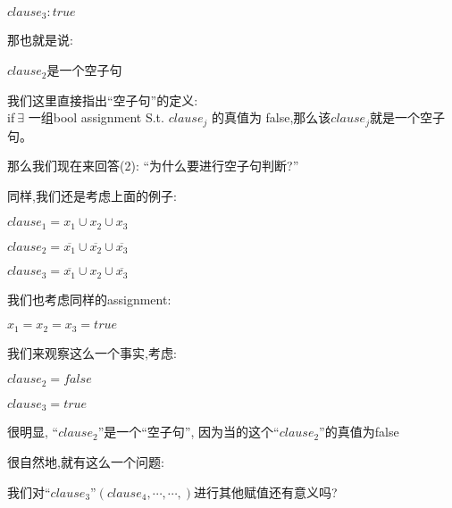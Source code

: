         \begin{center}
            $clause_{3}:true$
        \end{center}
        \par
        那也就是说:
        \begin{center}
            $clause_{2}$是一个空子句
        \end{center}
        \par
        我们这里直接指出``空子句''的定义:\\
        if$\ \exists$ 一组bool assignment 
        S.t. $clause_{j}$ 的真值为 false,那么该$clause_{j}$就是一个空子句。
        \newline
        \par
        那么我们现在来回答(2):   ``为什么要进行空子句判断?''\\
        \par
        同样,我们还是考虑上面的例子:
        \begin{center}
            $clause_{1} = x_{1} \cup x_{2} \cup x_{3}$
        \end{center}
        \begin{center}
            $clause_{2} = \overline{x_{1}} \cup \overline{x_{2}} \cup \overline{x_{3}}$
        \end{center}
        \begin{center}
            $clause_{3} = \overline{x_{1}} \cup x_{2} \cup \overline{x_{3}}$
        \end{center}
        \par
        我们也考虑同样的assignment:
        \begin{center}
            $x_{1}=x_{2}=x_{3}=true$
        \end{center}
        \par
        我们来观察这么一个事实,考虑:
        \begin{center}
            $clause_{2}=false$
        \end{center}
        \begin{center}
            $clause_{3}=true$
        \end{center}
        \par
        很明显,
        ``$clause_{2}$''是一个``空子句'',
        因为当的这个``$clause_{2}$''的真值为false
        \par
        很自然地,就有这么一个问题:
        \begin{center}
            我们对``$clause_{3}$''$(clause_{4},\cdots,\cdots,)$进行其他赋值还有意义吗?
        \end{center}
